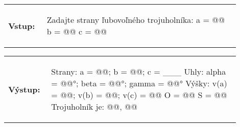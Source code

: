 \begin{tabular}{@{}p{0.15\linewidth}p{0.75\linewidth}}
\textbf{\small Vstup:} &
\vspace{-3em}
\begin{code}
Zadajte strany ľubovoľného trojuholníka:
a = @\fbox{\phantom{vstup}}@
b = @\fbox{\phantom{vstup}}@
c = @\fbox{\phantom{vstup}}@
\end{code}
\end{tabular}

\vspace{-2em}
\begin{tabular}{@{}p{0.15\linewidth}p{0.75\linewidth}}
\textbf{\small Výstup:} &
\vspace{-3em}
\begin{code}
Strany: a = @\fbox{\phantom{abc}}@; b = @\fbox{\phantom{abc}}@; c = ___
Uhly: alpha = @\fbox{\phantom{abc}}@°; beta = @\fbox{\phantom{abc}}@°; gamma = @\fbox{\phantom{vstup}}@°
Výšky: v(a) = @\fbox{\phantom{abc}}@; v(b) = @\fbox{\phantom{abc}}@; v(c) = @\fbox{\phantom{abc}}@
O = @\fbox{\phantom{abc}}@
S = @\fbox{\phantom{abc}}@
Trojuholník je: @\fbox{\phantom{abc}}@, @\fbox{\phantom{abc}}@
\end{code}
\end{tabular}
\vspace{-2em}

